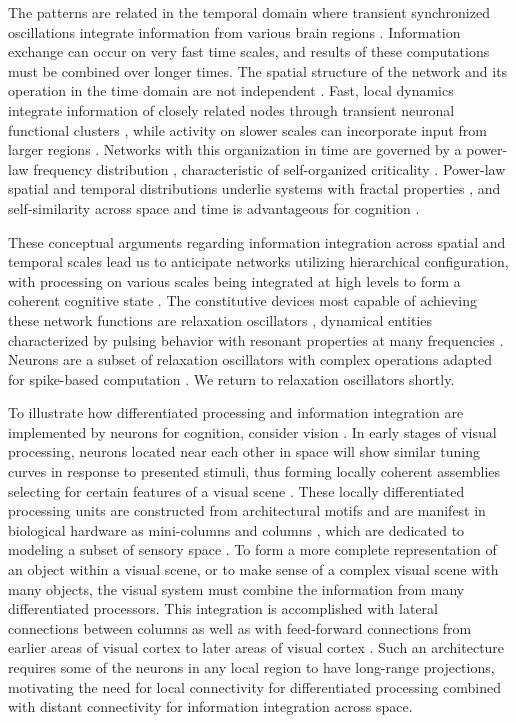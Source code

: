 \documentclass[aip,amsmath,amssymb,reprint,nofootinbib]{revtex4-1}
\begin{document}
The patterns are related in the temporal domain where transient synchronized oscillations integrate information from various brain regions \cite{vala2001,sase2001,enfr2001}. Information exchange can occur on very fast time scales, and results of these computations must be combined over longer times. The spatial structure of the network and its operation in the time domain are not independent \cite{spto2000,spto2002,waxu2006}. Fast, local dynamics integrate information of closely related nodes through transient neuronal functional clusters \cite{buwa2012}, while activity on slower scales can incorporate input from larger regions \cite{stsa2000}. Networks with this organization in time are governed by a power-law frequency distribution \cite{bata1987,budr2004,bu2006}, characteristic of self-organized criticality \cite{be2007}. Power-law spatial and temporal distributions underlie systems with fractal properties \cite{bata1987,bu2006}, and self-similarity across space and time is advantageous for cognition \cite{bu2006,be2007,kism2009,shya2009,ch2010,rusp2011}. 

These conceptual arguments regarding information integration across spatial and temporal scales lead us to anticipate networks utilizing hierarchical configuration, with processing on various scales being integrated at high levels to form a coherent cognitive state \cite{brto2006}. The constitutive devices most capable of achieving these network functions are relaxation oscillators \cite{bu2006,st2015}, dynamical entities characterized by pulsing behavior \cite{mist1990} with resonant properties at many frequencies \cite{soko1993,huya2000}. Neurons are a subset of relaxation oscillators with complex operations adapted for spike-based computation \cite{geki2002}. We return to relaxation oscillators shortly.

To illustrate how differentiated processing and information integration are implemented by neurons for cognition, consider vision \cite{laus2011}. In early stages of visual processing, neurons located near each other in space will show similar tuning curves \cite{daab2001} in response to presented stimuli, thus forming locally coherent assemblies selecting for certain features of a visual scene \cite{enfr2001}. These locally differentiated processing units are constructed from architectural motifs \cite{spko2004,onsa2005} and are manifest in biological hardware as mini-columns and columns \cite{mo1997}, which are dedicated to modeling a subset of sensory space \cite{haah2017}. To form a more complete representation of an object within a visual scene, or to make sense of a complex visual scene with many objects, the visual system must combine the information from many differentiated processors. This integration is accomplished with lateral connections between columns \cite{spto2000} as well as with feed-forward connections from earlier areas of visual cortex to later areas of visual cortex \cite{laus2011}. Such an architecture requires some of the neurons in any local region to have long-range projections, motivating the need for local connectivity for differentiated processing combined with distant connectivity for information integration across space. 
\end{document}

